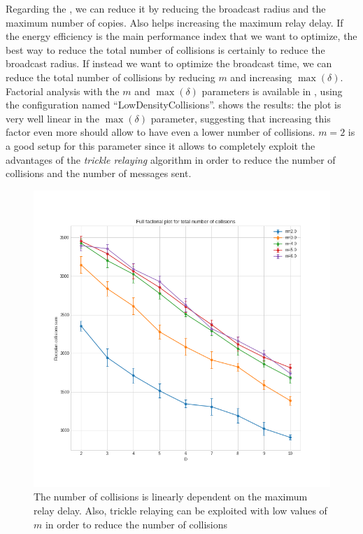 Regarding the , we can reduce it by
reducing the broadcast radius and the maximum number of copies. Also helps
increasing the maximum relay delay. If the energy efficiency is the main
performance index that we want to optimize, the best way to reduce the total
number of collisions is certainly to reduce the broadcast radius. If instead we
want to optimize the broadcast time, we can reduce the total number of
collisions by reducing \(m\) and increasing \(\max(\delta)\). Factorial
analysis with the \(m\) and \(\max(\delta)\) parameters is available in
, using the configuration named
``LowDensityCollisions''.  shows the results: the
plot is very well linear in the \(\max(\delta)\) parameter, suggesting that
increasing this factor even more should allow to have even a lower number of
collisions. \(m\!=\!2\) is a good setup for this parameter since it allows to
completely exploit the advantages of the \emph{trickle relaying} algorithm in
order to reduce the number of collisions and the number of messages sent.

\begin{figure}
	\centering
	\includegraphics[width=\textwidth]{img/hd/collisions-D-ffplot}
	\caption{The number of collisions is linearly dependent on the maximum
	relay delay. Also, trickle relaying can be exploited with low values of
	\(m\) in order to reduce the number of
	collisions}\label{fig:ldcollisionsff}
\end{figure}

